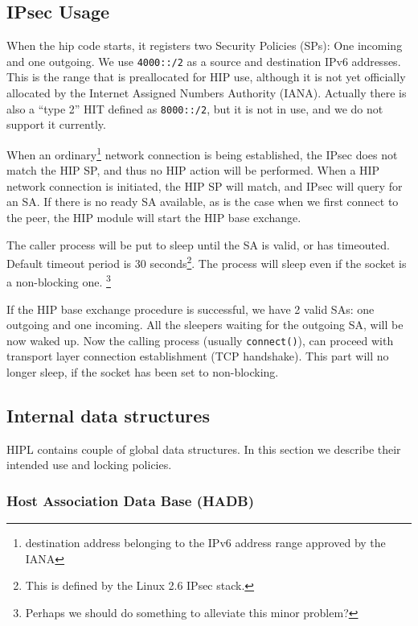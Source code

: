 \subsection{IPsec Usage}

When the hip code starts, it registers two Security Policies (SPs):
One incoming and one outgoing. We use \verb|4000::/2| as a source and
destination IPv6 addresses. This is the range that is preallocated for
HIP use, although it is not yet officially allocated by the Internet
Assigned Numbers Authority (IANA).  Actually there is also a ``type
2'' HIT defined as \verb|8000::/2|, but it is not in use, and we do not
support it currently.

When an ordinary\footnote{destination address belonging to the IPv6
address range approved by the IANA} network connection is being
established, the IPsec does not match the HIP SP, and thus no HIP
action will be performed. When a HIP network connection is initiated,
the HIP SP will match, and IPsec will query for an SA. If there is no
ready SA available, as is the case when we first connect to the peer,
the HIP module will start the HIP base exchange.

The caller process will be put to sleep until the SA is valid, or has
timeouted.  Default timeout period is 30 seconds\footnote{This is
defined by the Linux 2.6 IPsec stack.}. The process will sleep even if
the socket is a non-blocking one.
\footnote{Perhaps we should do something to alleviate this minor problem?}

If the HIP base exchange procedure is successful, we have 2 valid SAs:
one outgoing and one incoming. All the sleepers waiting for the
outgoing SA, will be now waked up. Now the calling process (usually
\verb|connect()|), can proceed with transport layer connection
establishment (TCP handshake). This part will no longer sleep, if the
socket has been set to non-blocking.

\subsection{Internal data structures}

HIPL contains couple of global data structures. In this section we
describe their intended use and locking policies.

\subsubsection{Host Association Data Base (HADB)}

